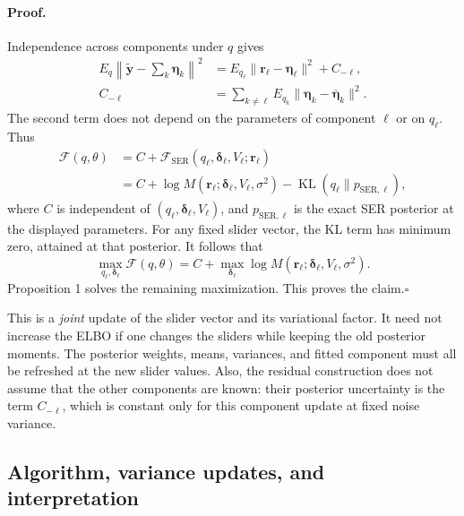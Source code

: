 \paragraph{Proof.}
Independence across components under $q$ gives
\begin{align}
E_q\left\|\widetilde{\mathbf y}
          -\sum_k\boldsymbol\eta_k\right\|^2
 &=E_{q_\ell}\|\mathbf r_\ell-\boldsymbol\eta_\ell\|^2
   +C_{-\ell},\nonumber\\
C_{-\ell}
 &=\sum_{k\neq\ell}
   E_{q_k}\|\boldsymbol\eta_k
                 -\overline{\boldsymbol\eta}_k\|^2.
\label{eq:veb-residual-decomposition}
\end{align}
The second term does not depend on the parameters of component
$\ell$ or on $q_\ell$. Thus
\begin{align}
\mathcal F(q,\theta)
 &=C+\mathcal F_{\mathrm{SER}}
       (q_\ell,\boldsymbol\delta_\ell,V_\ell;\mathbf r_\ell)
\label{eq:veb-block-identity}\\
 &=C+\log M(\mathbf r_\ell;
           \boldsymbol\delta_\ell,V_\ell,\sigma^2)
   -\operatorname{KL}(q_\ell\|p_{\mathrm{SER},\ell}),
\label{eq:veb-block-kl}
\end{align}
where $C$ is independent of $(q_\ell,\boldsymbol\delta_\ell,V_\ell)$,
and $p_{\mathrm{SER},\ell}$ is the exact SER posterior at the
displayed parameters. For any fixed slider vector, the KL term
has minimum zero, attained at that posterior. It follows that
\begin{equation}
\max_{q_\ell,\boldsymbol\delta_\ell}\mathcal F(q,\theta)
 =C+\max_{\boldsymbol\delta_\ell}
       \log M(\mathbf r_\ell;
                \boldsymbol\delta_\ell,V_\ell,\sigma^2).
\label{eq:veb-profiled-block}
\end{equation}
Proposition 1 solves the remaining maximization. This proves the
claim.\hfill$\square$

This is a \emph{joint} update of the slider vector and its
variational factor. It need not increase the ELBO if one changes
the sliders while keeping the old posterior moments. The posterior
weights, means, variances, and fitted component must all be refreshed
at the new slider values. Also, the residual construction does not
assume that the other components are known: their posterior
uncertainty is the term $C_{-\ell}$, which is constant only for this
component update at fixed noise variance.

\subsection{Algorithm, variance updates, and interpretation}

